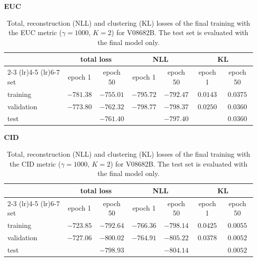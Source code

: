\begin{table}[H]
    \centering
    \textbf{EUC}\\[0.5ex]
    \begin{tabular}{lcccccc}
        \toprule
        & \multicolumn{2}{c}{\textbf{total loss}} & \multicolumn{2}{c}{\textbf{NLL}} & \multicolumn{2}{c}{\textbf{KL}} \\
        \cmidrule(lr){2-3} \cmidrule(lr){4-5} \cmidrule(lr){6-7}
        set & epoch 1 & epoch 50 & epoch 1 & epoch 50 & epoch 1 & epoch 50 \\
        \midrule
        training   & $-781.38$ & $-755.01$ & $-795.72$ & $-792.47$ & $0.0143$ & $0.0375$ \\
        validation & $-773.80$ & $-762.32$ & $-798.77$ & $-798.37$ & $0.0250$ & $0.0360$ \\
        test       &           & $-761.40$  &          & $-797.40$ &          & $0.0360$  \\
        \bottomrule
    \end{tabular}
    \caption{Total, reconstruction (NLL) and clustering (KL) losses of the final training with the \ac{EUC} metric ($\gamma = 1000$, $K = 2$) for V08682B. The test set is evaluated with the final model only.}
    \label{tab:eucl_V08682BB}
\end{table}

\begin{table}[H]
    \centering
    \textbf{CID}\\[0.5ex]
    \begin{tabular}{lcccccc}
        \toprule
        & \multicolumn{2}{c}{\textbf{total loss}} & \multicolumn{2}{c}{\textbf{NLL}} & \multicolumn{2}{c}{\textbf{KL}} \\
        \cmidrule(lr){2-3} \cmidrule(lr){4-5} \cmidrule(lr){6-7}
        set & epoch 1 & epoch 50 & epoch 1 & epoch 50 & epoch 1 & epoch 50 \\
        \midrule
        training   & $-723.85$ & $-792.64$ & $-766.36$ & $-798.14$ & $0.0425$ & $0.0055$ \\
        validation & $-727.06$ & $-800.02$ & $-764.91$ & $-805.22$ & $0.0378$ & $0.0052$ \\
        test       &           & $-798.93$ &           & $-804.14$ &          & $0.0052$  \\
        \bottomrule
    \end{tabular}
    \caption{Total, reconstruction (NLL) and clustering (KL) losses of the final training with the \ac{CID} metric ($\gamma = 1000$, $K = 2$) for V08682B. The test set is evaluated with the final model only.}
    \label{tab:cid_V08682B}
\end{table}

